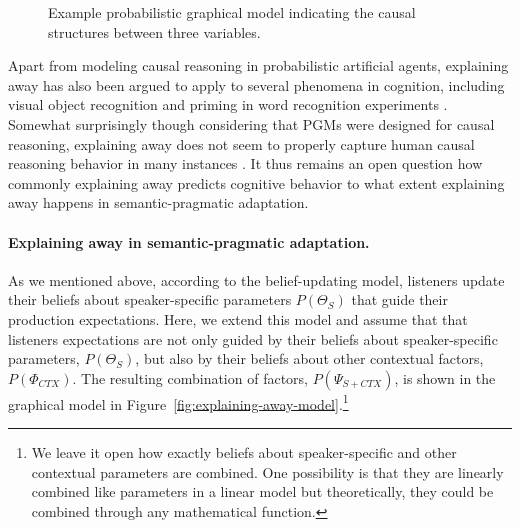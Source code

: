 \documentclass[man,floatsintext]{apa6}
\begin{document}
\begin{figure}[t]
    \centering
    \caption{Example probabilistic graphical model indicating the causal structures between three variables.}
    \label{fig:pgm-ex}
\end{figure}

Apart from modeling causal reasoning in probabilistic artificial agents, explaining away has also been argued to apply to several phenomena in cognition, including visual object recognition \cite{Murray2002} and priming in word recognition experiments \cite{Huber2008}. Somewhat surprisingly though considering that PGMs were designed for causal reasoning, explaining away does not seem to properly capture human causal reasoning behavior in many instances \cite[inter alia]{Morris1995,Tenenbaum2002,Rehder2017}. It thus remains an open question how commonly explaining away predicts cognitive behavior to what extent explaining away happens in semantic-pragmatic adaptation.

\paragraph{Explaining away in semantic-pragmatic adaptation.} As we mentioned above, according to the  belief-updating model, listeners update their beliefs about speaker-specific parameters $P(\Theta_S)$ that guide their production expectations. Here, we extend this model and assume that that listeners expectations are not only guided by their beliefs about speaker-specific parameters, $P(\Theta_S)$, but also by their beliefs about other contextual factors, $P(\Phi_{CTX})$. The resulting combination of factors, $P(\Psi_{S+CTX})$, is shown in the graphical model in Figure~\ref{fig:explaining-away-model}.\footnote{We leave it open how exactly beliefs about speaker-specific and other contextual parameters are combined. One  possibility is that they are linearly combined like parameters in a linear model but theoretically, they could be combined through any mathematical function.}
\end{document}
